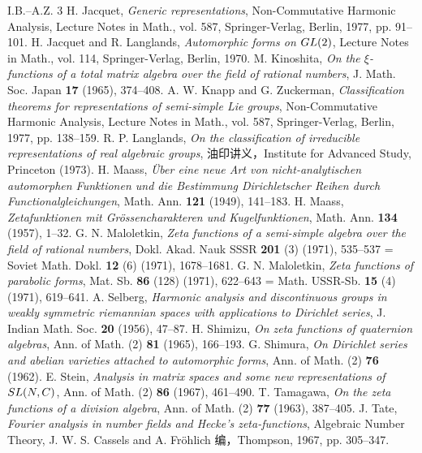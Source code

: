 \begin{thebibliography}{I.B.--A.Z. 3}
 H. Jacquet, \emph{Generic representations}, Non-Commutative Harmonic Analysis, Lecture Notes in Math., vol. 587, Springer-Verlag, Berlin, 1977, pp. 91--101.
 H. Jacquet and R. Langlands, \emph{Automorphic forms on $GL(2)$}, Lecture Notes in Math., vol. 114, Springer-Verlag, Berlin, 1970.
 M. Kinoshita, \emph{On the $\xi$-functions of a total matrix algebra over the field of rational numbers}, J. Math. Soc. Japan \textbf{17} (1965), 374--408.
 A. W. Knapp and G. Zuckerman, \emph{Classification theorems for representations of semi-simple Lie groups}, Non-Commutative Harmonic Analysis, Lecture Notes in Math., vol. 587, Springer-Verlag, Berlin, 1977, pp. 138--159.
 R. P. Langlands, \emph{On the classification of irreducible representations of real algebraic groups}, 油印讲义，Institute for Advanced Study, Princeton (1973).
 H. Maass, \emph{Über eine neue Art von nicht-analytischen automorphen Funktionen und die Bestimmung Dirichletscher Reihen durch Functionalgleichungen}, Math. Ann. \textbf{121} (1949), 141--183.
 H. Maass, \emph{Zetafunktionen mit Grössencharakteren und Kugelfunktionen}, Math. Ann. \textbf{134} (1957), 1--32.
 G. N. Maloletkin, \emph{Zeta functions of a semi-simple algebra over the field of rational numbers}, Dokl. Akad. Nauk SSSR \textbf{201} (3) (1971), 535--537 = Soviet Math. Dokl. \textbf{12} (6) (1971), 1678--1681.
 G. N. Maloletkin, \emph{Zeta functions of parabolic forms}, Mat. Sb. \textbf{86} (128) (1971), 622--643 = Math. USSR-Sb. \textbf{15} (4) (1971), 619--641.
 A. Selberg, \emph{Harmonic analysis and discontinuous groups in weakly symmetric riemannian spaces with applications to Dirichlet series}, J. Indian Math. Soc. \textbf{20} (1956), 47--87.
 H. Shimizu, \emph{On zeta functions of quaternion algebras}, Ann. of Math. (2) \textbf{81} (1965), 166--193.
 G. Shimura, \emph{On Dirichlet series and abelian varieties attached to automorphic forms}, Ann. of Math. (2) \textbf{76} (1962).
 E. Stein, \emph{Analysis in matrix spaces and some new representations of $SL(N,C)$}, Ann. of Math. (2) \textbf{86} (1967), 461--490.
 T. Tamagawa, \emph{On the zeta functions of a division algebra}, Ann. of Math. (2) \textbf{77} (1963), 387--405.
 J. Tate, \emph{Fourier analysis in number fields and Hecke's zeta-functions}, Algebraic Number Theory, J. W. S. Cassels and A. Fröhlich 编，Thompson, 1967, pp. 305--347.

\end{thebibliography}
